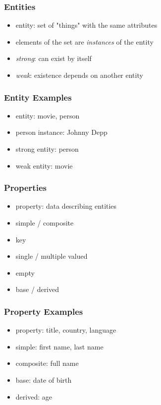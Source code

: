 \documentclass[dvipsnames]{beamer}
\begin{document}
\begin{frame}
  \frametitle{Entities}

  \begin{itemize}
    \item \alert{entity}: set of "things" with the same attributes
    \item elements of the set are \emph{instances} of the entity

    \medskip
    \item \emph{strong}: can exist by itself
    \item \emph{weak}: existence depends on another entity
  \end{itemize}
\end{frame}

\begin{frame}
  \frametitle{Entity Examples}

  \begin{itemize}
    \item entity: movie, person
    \item person instance: Johnny Depp

    \pause
    \medskip
    \item strong entity: person
    \item weak entity: movie
  \end{itemize}
\end{frame}

\begin{frame}
  \frametitle{Properties}

  \begin{itemize}
    \item \alert{property}: data describing entities

    \medskip
    \item simple / composite
    \item key
    \item single / multiple valued
    \item empty
    \item base / derived
  \end{itemize}
\end{frame}

\begin{frame}
  \frametitle{Property Examples}

  \begin{itemize}
    \item property: title, country, language

    \pause
    \medskip
    \item simple: first name, last name
    \item composite: full name

    \pause
    \medskip
    \item base: date of birth
    \item derived: age
  \end{itemize}
\end{frame}
\end{document}
